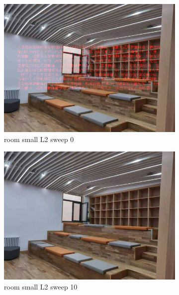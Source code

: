 \documentclass[11pt]{article}
\begin{document}
\begin{figure}[ht!]
    \centering
    \hfill%
    \begin{subfigure}[]{0.333\linewidth}
        \centering
        \includegraphics[width=\linewidth]{fig/restoration/room_small/L2/gibbs_0.jpg}
        \caption{room small L2 sweep 0}
    \end{subfigure}%
    \hfill%
    \begin{subfigure}[]{0.333\linewidth}
        \centering
        \includegraphics[width=\linewidth]{fig/restoration/room_small/L2/gibbs_10.jpg}
        \caption{room small L2 sweep 10}
    \end{subfigure}%
    \hfill%
    \begin{subfigure}[]{0.333\linewidth}

\end{subfigure}
\end{figure}
\end{document}

